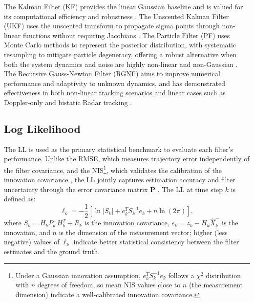\documentclass[conference]{IEEEtran}
\begin{document}
The Kalman Filter (KF) provides the linear Gaussian baseline and is valued for its computational efficiency and robustness \cite{Julier1997a}. The Unscented Kalman Filter (UKF) uses the unscented transform to propagate sigma points through non-linear functions without requiring Jacobians \cite{Julier1997a}. The Particle Filter (PF) uses Monte Carlo methods to represent the posterior distribution, with systematic resampling to mitigate particle degeneracy, offering a robust alternative when both the system dynamics and noise are highly non-linear and non-Gaussian \cite{Arulampalam2007, NJGordon}. The Recursive Gauss-Newton Filter (RGNF) aims to improve numerical performance and adaptivity to unknown dynamics, and has demonstrated effectiveness in both non-linear tracking scenarios and linear cases such as Doppler-only and bistatic Radar tracking \cite{Inggs1, De2015, roaldje}.


\subsection{Log Likelihood}
The LL is used as the primary statistical benchmark to evaluate each filter's performance. Unlike the RMSE, which measures trajectory error independently of the filter covariance, and the NIS\footnote{Under a Gaussian innovation assumption, $e_k^T S_k^{-1} e_k$ follows a $\chi^2$ distribution with $n$ degrees of freedom, so mean NIS values close to $n$ (the measurement dimension) indicate a well-calibrated innovation covariance.}, which validates the calibration of the innovation covariance \cite{BarShalom2001}, the LL jointly captures estimation accuracy and filter uncertainty through the error covariance matrix $\mathbf{P}$ \cite{labbe2014kalman, Grewal2006}. The LL at time step $k$ is defined as:
\begin{equation}
  \ell_k = -\frac{1}{2}\left[\ln|S_k| + e_k^T S_k^{-1} e_k + n\ln(2\pi)\right],
\end{equation}
where $S_k = H_k P_k^- H_k^T + R_k$ is the innovation covariance, $e_k = z_k - H_k \hat{X}_k^-$ is the innovation, and $n$ is the dimension of the measurement vector; higher (less negative) values of $\ell_k$ indicate better statistical consistency between the filter estimates and the ground truth.
\end{document}
